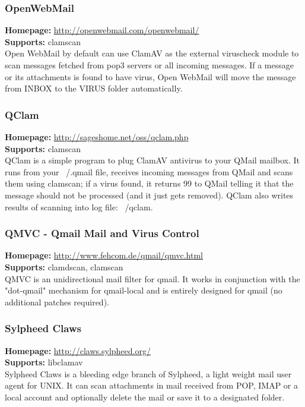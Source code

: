\documentclass[a4paper,titlepage,12pt]{article}
\begin{document}
    \subsubsection{OpenWebMail}
    \textbf{Homepage:} \url{http://openwebmail.com/openwebmail/}\\
    \textbf{Supports:} clamscan\\[4pt]
    Open WebMail by default can use ClamAV as the external viruscheck module
    to scan messages fetched from pop3 servers or all incoming messages. If a
    message or its attachments is found to have virus, Open WebMail will move
    the message from INBOX to the VIRUS folder automatically.

    \subsubsection{QClam}
    \textbf{Homepage:} \url{http://sageshome.net/oss/qclam.php}\\
    \textbf{Supports:} clamscan\\[4pt]
    QClam is a simple program to plug ClamAV antivirus to your QMail mailbox.
    It runs from your ~/.qmail file, receives incoming messages from QMail and
    scans them using clamscan; if a virus found, it returns 99 to QMail telling
    it that the message should not be processed (and it just gets removed).
    QClam also writes results of scanning into log file: ~/qclam.

    \subsubsection{QMVC - Qmail Mail and Virus Control}
    \textbf{Homepage:} \url{http://www.fehcom.de/qmail/qmvc.html}\\
    \textbf{Supports:} clamdscan, clamscan\\[4pt]
    QMVC is an unidirectional mail filter for qmail. It works in conjunction
    with the "dot-qmail" mechanism for qmail-local and is entirely designed
    for qmail (no additional patches required).

    \subsubsection{Sylpheed Claws}
    \textbf{Homepage:} \url{http://claws.sylpheed.org/}\\
    \textbf{Supports:} libclamav\\[4pt]
    Sylpheed Claws is a bleeding edge branch of Sylpheed, a light weight mail
    user agent for UNIX. It can scan attachments in mail received from POP,
    IMAP or a local account and optionally delete the mail or save it to a
    designated folder.
 
\end{document}
